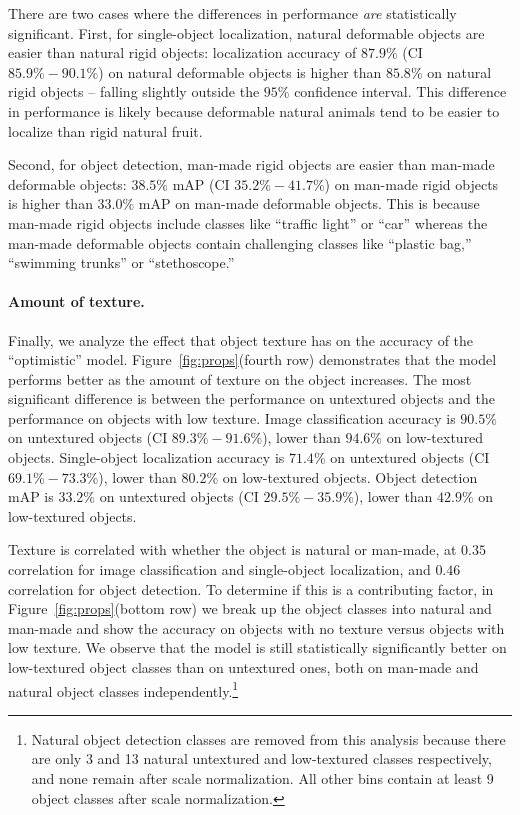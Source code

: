 There are two cases where the differences in performance \emph{are} statistically significant. First, for single-object localization, natural deformable objects are easier than natural rigid objects: localization accuracy of $87.9\%$ (CI $85.9\%- 90.1\%$) on natural deformable objects is higher than $85.8\%$ on natural rigid objects -- falling slightly outside the $95\%$ confidence interval. This difference in performance is likely because deformable natural animals tend to be easier to localize than rigid natural fruit.

Second, for object detection, man-made rigid objects are easier than man-made deformable objects: $38.5\%$ mAP (CI $35.2\%-41.7\%$) on man-made rigid objects is higher than $33.0\%$ mAP on man-made deformable objects. This is because man-made rigid objects include classes like ``traffic light'' or ``car'' whereas the man-made deformable objects contain challenging classes like ``plastic bag,'' ``swimming trunks'' or ``stethoscope.''


\paragraph{Amount of texture.} Finally, we analyze the effect that object texture has on the accuracy of the ``optimistic'' model. Figure~\ref{fig:props}(fourth row) demonstrates that the model performs better as the amount of texture on the object increases. The most significant difference is between
the performance on untextured objects and the performance on objects with low texture. Image classification accuracy is $90.5\%$ on untextured objects (CI $89.3\%-91.6\%$),  lower than $94.6\%$ on low-textured objects. Single-object localization accuracy is $71.4\%$  on untextured objects (CI $69.1\%-73.3\%$),  lower
than $80.2\%$ on low-textured objects. Object detection mAP is $33.2\%$  on untextured objects (CI $29.5\%-35.9\%$),  lower than $42.9\%$ on low-textured objects.

Texture is correlated with whether the object is natural or man-made, at $0.35$ correlation for image classification and single-object localization, and $0.46$ correlation for object detection. To determine if this is a contributing factor, in Figure~\ref{fig:props}(bottom row) we break up the object classes into natural and man-made and show the accuracy on objects with no texture versus objects with low texture. We observe that the model is still statistically significantly better on low-textured object classes than on untextured ones, both on man-made and natural object classes independently.\footnote{Natural object detection classes are removed from this analysis because there are only 3 and 13 natural untextured and low-textured classes respectively, and none remain after scale normalization. All other bins contain at least 9 object classes after scale normalization.}

